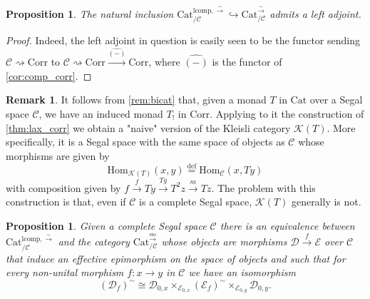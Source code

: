 \documentclass[a4paper, reqno]{amsart}
\newtheorem{prop}[theorem]{Proposition}
\theoremstyle{definition}
\newtheorem{remark}[theorem]{Remark}
\newcommand\cC{\mathscr C}
\newcommand\cD{\mathscr D}
\newcommand\cE{\mathscr E}
\newcommand\cK{\mathscr K}
\newcommand\mor{\mathrm{Hom}}
\newcommand\cat{\mathrm{Cat}}
\newcommand\lcomp{\mathrm{lcomp}}
\newcommand\bydef{\overset{\mathrm{def}}{=}}
\newcommand\corr{\mathrm{Corr}}
\newcommand\wrr{{\overset{\sim}{\rightarrow}}}
\newcommand\eso{\mathrm{eso}}
\begin{document}
\begin{prop}
The natural inclusion $\cat^{\lcomp,\wrr}_{/\cC}\hookrightarrow\cat^\wrr_{/\cC}$ admits a left adjoint.
\end{prop}
\begin{proof}
Indeed, the left adjoint in question is easily seen to be the functor sending $\cC\rightsquigarrow\corr$ to $\cC\rightsquigarrow\corr\xrightarrow{\widehat{(-)}}\corr$, where $\widehat{(-)}$ is the functor of \cref{cor:comp_corr}.
\end{proof}
\begin{remark}
It follows from \cref{rem:bicat} that, given a monad $T$ in $\cat$ over a Segal space $\cC$, we have an induced monad $T_!$ in $\corr$. Applying to it the construction of \cref{thm:lax_corr} we obtain a "naive" version of the Kleisli category $\cK(T)$. More specifically, it is a Segal space with the same space of objects as $\cC$ whose morphisms are given by \[\mor_{\cK(T)}(x,y)\bydef\mor_\cC(x,Ty)\]
with composition given by $f\xrightarrow{f}Ty\xrightarrow{Tg}T^2z\xrightarrow{m}Tz$. The problem with this construction is that, even if $\cC$ is a complete Segal space, $\cK(T)$ generally is not.
\end{remark}
\begin{prop}\label{prop:monad_v2}
Given a complete Segal space $\cC$ there is an equivalence between $\cat^{\lcomp,\wrr}_{/\cC}$ and the category $\cat^{\overset{\eso}{\rightarrow}}_{/\cC}$ whose objects are morphisms $\cD\xrightarrow{f}\cE$ over $\cC$ that induce an effective epimorphism on the space of objects and such that for every non-unital morphism $f:x\rightarrow y$ in $\cC$ we have an isomorphism
\[(\cD_f)^\sim\cong \cD_{0,x}\times_{\cE_{0,x}}(\cE_f)^\sim\times_{\cE_{0,y}}\cD_{0,y}.\]
\end{prop}
\end{document}
